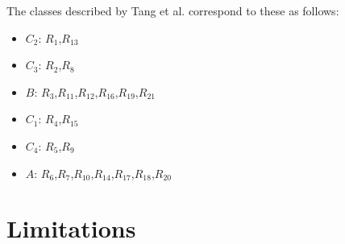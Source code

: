 \documentclass{amsart}
\begin{document}
The classes described by Tang et al. \cite{TANG2014} correspond to these as follows:
\begin{itemize}
    \item $C_2$: $R_1$,$R_{13}$
    \item $C_3$: $R_2$,$R_8$
    \item $B$: $R_3$,$R_{11}$,$R_{12}$,$R_{16}$,$R_{19}$,$R_{21}$
    \item $C_1$: $R_4$,$R_{15}$
    \item $C_4$: $R_5$,$R_9$
    \item $A$: $R_6$,$R_7$,$R_{10}$,$R_{14}$,$R_{17}$,$R_{18}$,$R_{20}$
\end{itemize}




\section{Limitations}




\end{document}
